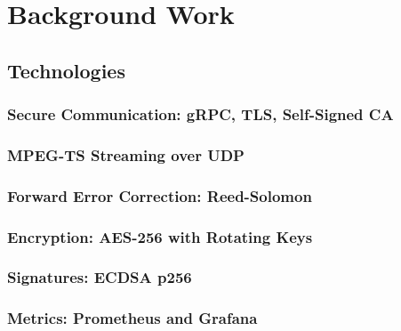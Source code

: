 
\chapter{Background Work}


\label{BackgroundWork}


\section{Technologies}
\subsection{Secure Communication: gRPC, TLS, Self-Signed CA}
\subsection{MPEG-TS Streaming over UDP}
\subsection{Forward Error Correction: Reed-Solomon}
\subsection{Encryption: AES-256 with Rotating Keys}
\subsection{Signatures: ECDSA p256}
\subsection{Metrics: Prometheus and Grafana}
